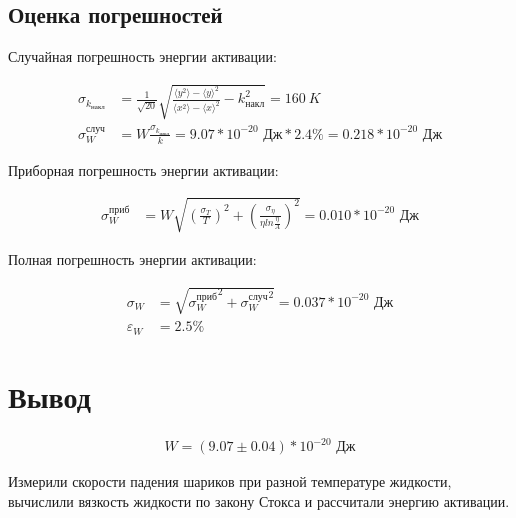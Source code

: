 \documentclass[a4paper]{article}
\begin{document}
    \subsection{Оценка погрешностей}

    Случайная погрешность энергии активации:

    \begin{align*}
        \sigma_{k_{накл}} &= \frac{1}{\sqrt{20}} \sqrt{\frac{\langle y^2 \rangle - {\langle y \rangle}^2}{\langle x^2 \rangle - {\langle x \rangle}^2} - k_{накл}^2} = 160~K\\
        \sigma_W^{случ} &= W \frac{\sigma_{k_{накл}}}{k} = 9.07 * 10^{-20} \text{ Дж} * 2.4\% = 0.218 * 10^{-20} \text{ Дж}
    \end{align*}

    Приборная погрешность энергии активации:

    \begin{align*}
        \sigma_W^{приб} &= W \sqrt{\left( \frac{\sigma_T}{T} \right)^2 + \left( \frac{\sigma_{\eta}}{\eta ln \frac{\eta}{A}} \right)^2} = 0.010 * 10^{-20}\text{ Дж}
    \end{align*}

    Полная погрешность энергии активации:

    \begin{align*}
        \sigma_W &= \sqrt{{\sigma_W^{приб}}^2 + {\sigma_W^{случ}}^2} = 0.037* 10^{-20}\text{ Дж}\\
        \varepsilon_W &= 2.5\%
    \end{align*}

    \section{Вывод}

    \begin{align*}
        W = (9.07 \pm 0.04) * 10^{-20} \text{ Дж}
    \end{align*}

    Измерили скорости падения шариков при разной температуре жидкости, вычислили вязкость жидкости по закону Стокса и рассчитали энергию активации.
\end{document}
